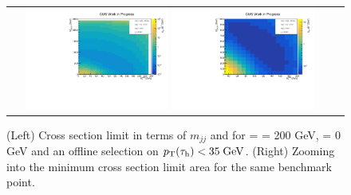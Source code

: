 \begin{figure}[tbh!]
	\centering
	\begin{tabular}{cc}
		\includegraphics[width=0.45\textwidth]{analysis/pics/JetInvMass_vs_MET_xsec_chi200_lsp000_taupt35.pdf}
		\includegraphics[width=0.45\textwidth]{analysis/pics/JetInvMass_vs_MET_xsec_chi200_lsp000_taupt35_zoom.pdf} 		
	\end{tabular}
	\caption{(Left) Cross section limit in terms of $m_{jj}$ and \met for \charginopm = \neutralinotwo = 200 GeV, \neutralinoone = 0 GeV and an offline selection on $p_{\text{T}}(\tau_{\text{h}}) <  35\;\text{Ge}\kern-0.06667em\text{V}$. (Right) Zooming into the minimum cross section limit area for the same benchmark point.}
	\label{fig::JetInvMass_vs_MET_xsec_chi200_lsp000_taupt35}
\end{figure}

